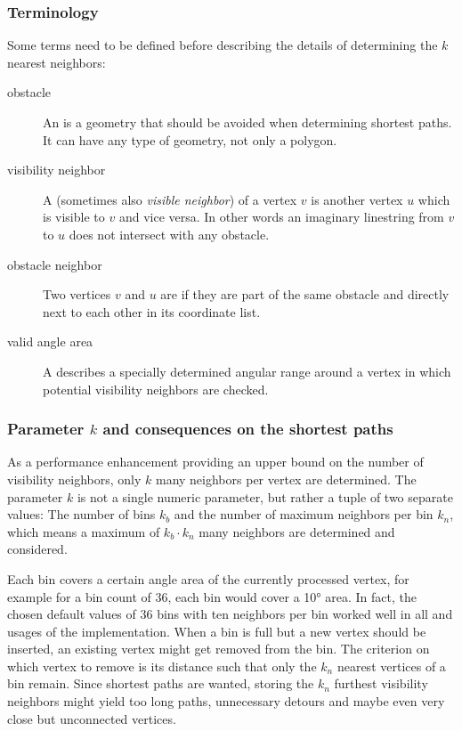 		\subsubsection{Terminology}
		
			Some terms need to be defined before describing the details of determining the $k$ nearest neighbors:
			\begin{description}
				\item[obstacle] An  is a geometry that should be avoided when determining shortest paths. It can have any type of geometry, not only a polygon.
				\item[visibility neighbor] A  (sometimes also \emph{visible neighbor}) of a vertex $v$ is another vertex $u$ which is visible to $v$ and vice versa. In other words an imaginary linestring from $v$ to $u$ does not intersect with any obstacle.
				\item[obstacle neighbor] Two vertices $v$ and $u$ are  if they are part of the same obstacle and directly next to each other in its coordinate list.
				\item[valid angle area] A  describes a specially determined angular range around a vertex in which potential visibility neighbors are checked.
			\end{description}
		
		\subsubsection{Parameter $k$ and consequences on the shortest paths}
		
			As a performance enhancement providing an upper bound on the number of visibility neighbors, only $k$ many neighbors per vertex are determined.
			The parameter $k$ is not a single numeric parameter, but rather a tuple of two separate values:
			The number of bins $k_b$ and the number of maximum neighbors per bin $k_n$, which means a maximum of $k_b \cdot k_n$ many neighbors are determined and considered.
			
			Each bin covers a certain angle area of the currently processed vertex, for example for a bin count of 36, each bin would cover a 10° area.
			In fact, the chosen default values of 36 bins with ten neighbors per bin worked well in all and usages of the implementation.
			When a bin is full but a new vertex should be inserted, an existing vertex might get removed from the bin.
			The criterion on which vertex to remove is its distance such that only the $k_n$ nearest vertices of a bin remain.
			Since shortest paths are wanted, storing the $k_n$ furthest visibility neighbors might yield too long paths, unnecessary detours and maybe even very close but unconnected vertices.
			
